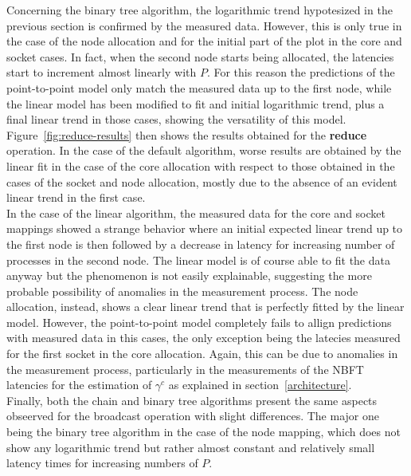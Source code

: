 \documentclass[../main.tex]{subfiles}
\begin{document}
Concerning the binary tree algorithm, the logarithmic trend hypotesized in the previous section is confirmed by the measured data. However, this is only true in the case of the node allocation and for the initial part of the plot in the core and socket cases. In fact, when the second node starts being allocated, the latencies start to increment almost linearly with $P$. For this reason the predictions of the point-to-point model only match the measured data up to the first node, while the linear model has been modified to fit and initial logarithmic trend, plus a final linear trend in those cases, showing the versatility of this model.\\
Figure~\ref{fig:reduce-results} then shows the results obtained for the \textbf{reduce} operation. In the case of the default algorithm, worse results are obtained by the linear fit in the case of the core allocation with respect to those obtained in the cases of the socket and node allocation, mostly due to the absence of an evident linear trend in the first case.\\
In the case of the linear algorithm, the measured data for the core and socket mappings showed a strange behavior where an initial expected linear trend up to the first node is then followed by a decrease in latency for increasing number of processes in the second node. The linear model is of course able to fit the data anyway but the phenomenon is not easily explainable, suggesting the more probable possibility of anomalies in the measurement process. The node allocation, instead, shows a clear linear trend that is perfectly fitted by the linear model. However, the point-to-point model completely fails to allign predictions with measured data in this cases, the only exception being the latecies measured for the first socket in the core allocation. Again, this can be due to anomalies in the measurement process, particularly in the measurements of the NBFT latencies for the estimation of $\gamma^{c}$ as explained in section~\ref{architecture}.\\
Finally, both the chain and binary tree algorithms present the same aspects obseerved for the broadcast operation with slight differences. The major one being the binary tree algorithm in the case of the node mapping, which does not show any logarithmic trend but rather almost constant and relatively small latency times for increasing numbers of $P$.\\
\end{document}

